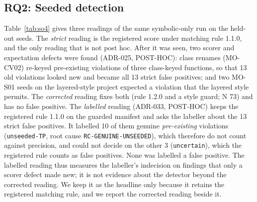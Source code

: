 \documentclass[10pt,a4paper]{article}
\begin{document}
\subsection{RQ2: Seeded detection}\label{sec:rq2}

Table~\ref{tab:so4} gives three readings of the same symbolic-only run on the held-out seeds. The \emph{strict}
reading is the registered score under matching rule 1.1.0, and the only reading that is not post hoc. After it was
seen, two scorer and expectation defects were found (ADR-025, POST-HOC): class renames (MO-CV02) re-keyed
pre-existing violations of three class-keyed functions, so that 13 old violations looked new and became all 13 strict
false positives; and two MO-S01 seeds on the layered-style project expected a violation that the layered style
permits. The \emph{corrected} reading fixes both (rule 1.2.0 and a style guard; N 73) and has no false positive. The
\emph{labelled} reading (ADR-033, POST-HOC) keeps the registered rule 1.1.0 on the guarded manifest and asks the
labeller about the 13 strict false positives. It labelled 10 of them genuine \emph{pre-existing} violations
(\texttt{unseeded-TP}, root cause \texttt{RC-GENUINE-UNSEEDED}), which therefore do not count against precision,
and could not decide on the other 3 (\texttt{uncertain}), which the registered rule counts as false positives. None
was labelled a false positive. The labelled reading thus measures the labeller's indecision on findings that only a
scorer defect made new; it is not evidence about the detector beyond the corrected reading. We keep it as the
headline only because it retains the registered matching rule, and we report the corrected reading beside it.
\end{document}
